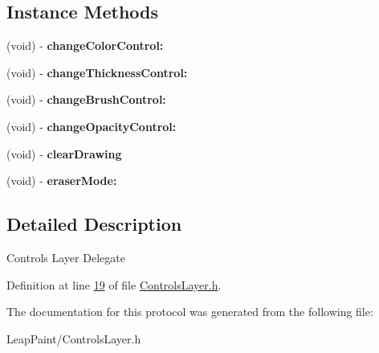 \subsection*{Instance Methods}
\begin{DoxyCompactItemize}
\item 
\hypertarget{protocol_controls_layer_delegate-p_ae43a35a6ddca486c0ddbe044d4e59c6a}{(void) -\/ {\bfseries change\-Color\-Control\-:}}\label{db/d3c/protocol_controls_layer_delegate-p_ae43a35a6ddca486c0ddbe044d4e59c6a}

\item 
\hypertarget{protocol_controls_layer_delegate-p_ae067b1264299a12d48213857ab3df45e}{(void) -\/ {\bfseries change\-Thickness\-Control\-:}}\label{db/d3c/protocol_controls_layer_delegate-p_ae067b1264299a12d48213857ab3df45e}

\item 
\hypertarget{protocol_controls_layer_delegate-p_a74beabc6dd814b96172efa611058759c}{(void) -\/ {\bfseries change\-Brush\-Control\-:}}\label{db/d3c/protocol_controls_layer_delegate-p_a74beabc6dd814b96172efa611058759c}

\item 
\hypertarget{protocol_controls_layer_delegate-p_ad4fc244191c678ef9b27a2ffdb00a70a}{(void) -\/ {\bfseries change\-Opacity\-Control\-:}}\label{db/d3c/protocol_controls_layer_delegate-p_ad4fc244191c678ef9b27a2ffdb00a70a}

\item 
\hypertarget{protocol_controls_layer_delegate-p_a6dc6c910f8147fd574e24f4f6e1cd48d}{(void) -\/ {\bfseries clear\-Drawing}}\label{db/d3c/protocol_controls_layer_delegate-p_a6dc6c910f8147fd574e24f4f6e1cd48d}

\item 
\hypertarget{protocol_controls_layer_delegate-p_a652a78380947aba4783ddfb6e153287d}{(void) -\/ {\bfseries eraser\-Mode\-:}}\label{db/d3c/protocol_controls_layer_delegate-p_a652a78380947aba4783ddfb6e153287d}

\end{DoxyCompactItemize}


\subsection{Detailed Description}
Controls Layer Delegate 

Definition at line \hyperlink{_controls_layer_8h_source_l00019}{19} of file \hyperlink{_controls_layer_8h_source}{Controls\-Layer.\-h}.



The documentation for this protocol was generated from the following file\-:\begin{DoxyCompactItemize}
\item 
Leap\-Paint/Controls\-Layer.\-h\end{DoxyCompactItemize}

